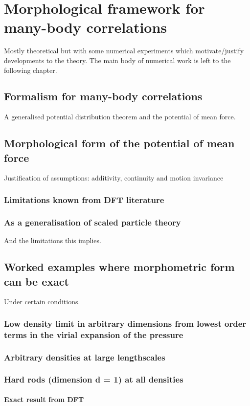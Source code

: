 \documentclass[12pt]{report}
\begin{document}
\chapter{Morphological framework for many-body correlations}
Mostly theoretical but with some numerical experiments which motivate/justify developments to the theory.
The main body of numerical work is left to the following chapter.

\section{Formalism for many-body correlations}
A generalised potential distribution theorem and the potential of mean force.

\section{Morphological form of the potential of mean force}
Justification of assumptions: additivity, continuity and motion invariance
\subsection{Limitations known from DFT literature}
\subsection{As a generalisation of scaled particle theory}
And the limitations this implies.

\section{Worked examples where morphometric form can be exact}
Under certain conditions.
\subsection{Low density limit in arbitrary dimensions from lowest order terms in the virial expansion of the pressure}
\subsection{Arbitrary densities at large lengthscales}
\subsection{Hard rods (dimension d = 1) at all densities}
\subsubsection{Exact result from DFT}
\end{document}
